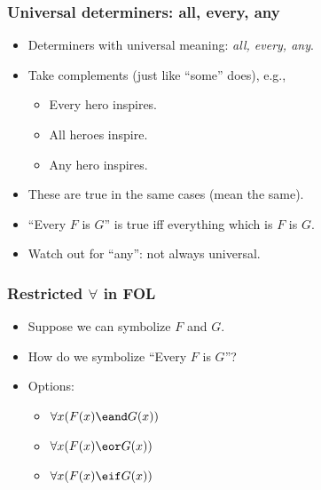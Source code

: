 \begin{frame}
\frametitle{Universal determiners: all, every, any}

\begin{itemize}[<+->]
  \item Determiners with universal meaning: \emph{all, every, any}.
  \item Take complements (just like ``some'' does), e.g.,
      \begin{itemize}[<+->]
        \item \alert{Every hero} inspires.
        \item \alert{All heroes} inspire.
        \item \alert{Any hero} inspires.
      \end{itemize}
  \item These are true in the same cases (mean the same).
  \item ``Every $F$ is $G$'' is true iff everything \alert{which is
  $F$} is $G$.
  \item Watch out for ``any'': not always universal.
\end{itemize}
\end{frame}

\begin{frame}
\frametitle{Restricted $\forall$ in FOL}

  \begin{itemize}[<+->]
    \item Suppose we can symbolize $F$ and $G$.
    \item How do we symbolize ``Every $F$ is $G$''?
    \item Options:
      \begin{itemize}[<+->]
        \item \alert{$\forall x(F(x) \eand G(x))$}
        \\
        \item \alert{$\forall x(F(x) \eor G(x))$}
        \\ 
        \item \alert{$\forall x(F(x) \eif G(x))$}
        \\ 
      \end{itemize}
  \end{itemize}
\end{frame}

